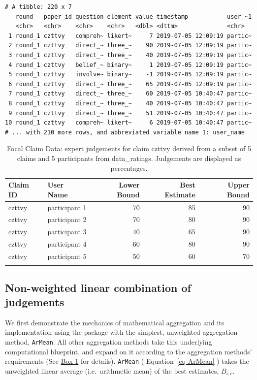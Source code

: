 \documentclass[article]{jss}
\begin{document}
\begin{verbatim}
# A tibble: 220 x 7
   round   paper_id question element value timestamp           user_~1
   <chr>   <chr>    <chr>    <chr>   <dbl> <dttm>              <chr>  
 1 round_1 czttvy   compreh~ likert~     7 2019-07-05 12:09:19 partic~
 2 round_1 czttvy   direct_~ three_~    90 2019-07-05 12:09:19 partic~
 3 round_1 czttvy   direct_~ three_~    40 2019-07-05 12:09:19 partic~
 4 round_1 czttvy   belief_~ binary~     1 2019-07-05 12:09:19 partic~
 5 round_1 czttvy   involve~ binary~    -1 2019-07-05 12:09:19 partic~
 6 round_1 czttvy   direct_~ three_~    65 2019-07-05 12:09:19 partic~
 7 round_1 czttvy   direct_~ three_~    60 2019-07-05 10:40:47 partic~
 8 round_1 czttvy   direct_~ three_~    40 2019-07-05 10:40:47 partic~
 9 round_1 czttvy   direct_~ three_~    51 2019-07-05 10:40:47 partic~
10 round_1 czttvy   compreh~ likert~     6 2019-07-05 10:40:47 partic~
# ... with 210 more rows, and abbreviated variable name 1: user_name
\end{verbatim}

\hypertarget{tbl-focal-claim}{}
\begin{longtable}{llrrr}

\toprule
Claim ID & User Name & Lower Bound & Best Estimate & Upper Bound \\ 
\midrule
czttvy & participant 1 & 70 & 85 & 90 \\ 
czttvy & participant 2 & 70 & 80 & 90 \\ 
czttvy & participant 3 & 40 & 65 & 90 \\ 
czttvy & participant 4 & 60 & 80 & 90 \\ 
czttvy & participant 5 & 50 & 60 & 70 \\ 
\bottomrule
\caption{\label{tbl-focal-claim}Focal Claim Data: expert judgements for claim czttvy derived from a
subset of 5 claims and 5 participants from data\_ratings. Judgements are
displayed as percentages. }\tabularnewline
\end{longtable}

\hypertarget{sec-AverageWAgg}{%
\subsection{Non-weighted linear combination of
judgements}\label{sec-AverageWAgg}}

We first demonstrate the mechanics of mathematical aggregation and its
implementation using the  package with the simplest,
unweighted aggregation method, \texttt{ArMean}. All other aggregation
methods take this underlying computational blueprint, and expand on it
according to the aggregation methods' requirements (See
\protect\hyperlink{aggWorkflow}{Box 1} for details). \texttt{ArMean} (
Equation~\ref{eq-ArMean} ) takes the unweighted linear average
(i.e.~arithmetic mean) of the best estimates, \(B_{i,c}\).
\end{document}
